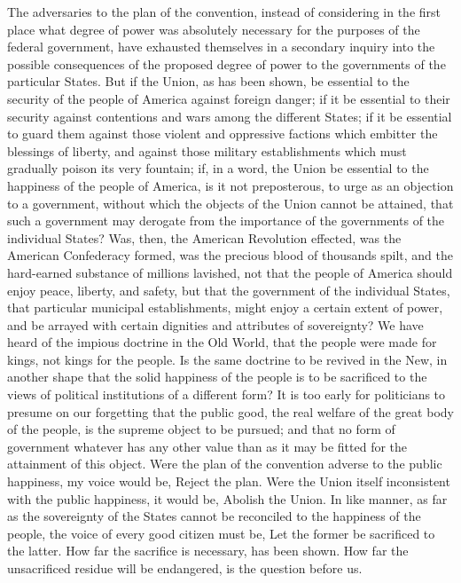 The adversaries to the plan of the convention, instead of considering in the first place what degree of power was absolutely necessary for the purposes of the federal government, have exhausted themselves in a secondary inquiry into the possible consequences of the proposed degree of power to the governments of the particular States. 
But if the Union, as has been shown, be essential to the security of the people of America against foreign danger; if it be essential to their security against contentions and wars among the different States; if it be essential to guard them against those violent and oppressive factions which embitter the blessings of liberty, and against those military establishments which must gradually poison its very fountain; if, in a word, the Union be essential to the happiness of the people of America, is it not preposterous, to urge as an objection to a government, without which the objects of the Union cannot be attained, that such a government may derogate from the importance of the governments of the individual States? 
Was, then, the American Revolution effected, was the American Confederacy formed, was the precious blood of thousands spilt, and the hard-earned substance of millions lavished, not that the people of America should enjoy peace, liberty, and safety, but that the government of the individual States, that particular municipal establishments, might enjoy a certain extent of power, and be arrayed with certain dignities and attributes of sovereignty? 
We have heard of the impious doctrine in the Old World, that the people were made for kings, not kings for the people. 
Is the same doctrine to be revived in the New, in another shape that the solid happiness of the people is to be sacrificed to the views of political institutions of a different form? 
It is too early for politicians to presume on our forgetting that the public good, the real welfare of the great body of the people, is the supreme object to be pursued; and that no form of government whatever has any other value than as it may be fitted for the attainment of this object. 
Were the plan of the convention adverse to the public happiness, my voice would be, Reject the plan. 
Were the Union itself inconsistent with the public happiness, it would be, Abolish the Union. 
In like manner, as far as the sovereignty of the States cannot be reconciled to the happiness of the people, the voice of every good citizen must be, Let the former be sacrificed to the latter. 
How far the sacrifice is necessary, has been shown. 
How far the unsacrificed residue will be endangered, is the question before us.

